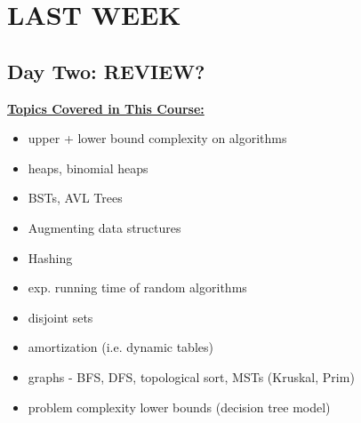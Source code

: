 \documentclass{article}
\begin{document}
	\section{LAST WEEK}
	\subsection{Day Two: REVIEW?}
	\underline{\textbf{Topics Covered in This Course:}}
	\begin{itemize}
		\item upper + lower bound complexity on algorithms
		\item heaps, binomial heaps
		\item BSTs, AVL Trees
		\item Augmenting data structures
		\item Hashing
		\item exp. running time of random algorithms
		\item disjoint sets
		\item amortization (i.e. dynamic tables)
		\item graphs - BFS, DFS, topological sort, MSTs (Kruskal, Prim)
		\item problem complexity lower bounds (decision tree model)
	\end{itemize}
\end{document}
